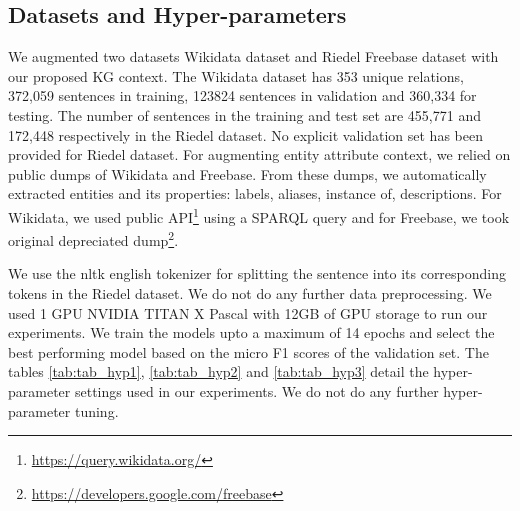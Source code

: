 \documentclass[11pt,a4paper]{article}
\begin{document}
\subsection{Datasets and Hyper-parameters}
We augmented two datasets Wikidata dataset and Riedel Freebase dataset with our proposed KG context. The Wikidata dataset has 353 unique relations, 372,059 sentences in training, 123824 sentences in validation and  360,334 for testing. The number of sentences in the training and test set are 455,771 and  172,448  respectively in the Riedel dataset. No explicit validation set has been provided for Riedel dataset. For augmenting entity attribute context, we relied on public dumps of Wikidata and Freebase. From these dumps, we automatically extracted entities and its properties: labels, aliases, instance of, descriptions. For Wikidata, we used public API\footnote{\url{https://query.wikidata.org/}} using a SPARQL query and for Freebase, we took original depreciated dump\footnote{\url{https://developers.google.com/freebase}}.

We use the nltk english tokenizer for splitting the sentence into its corresponding tokens in the Riedel dataset. We do not do any further data preprocessing. We used 1 GPU NVIDIA TITAN X Pascal with 12GB of GPU storage to run our experiments. We train the models upto a maximum of 14 epochs and select the best performing model based on the micro F1 scores of the validation set. The tables \ref{tab:tab_hyp1}, \ref{tab:tab_hyp2} and \ref{tab:tab_hyp3} detail the hyper-parameter settings used in our experiments. We do not do any further hyper-parameter tuning. 
\end{document}
